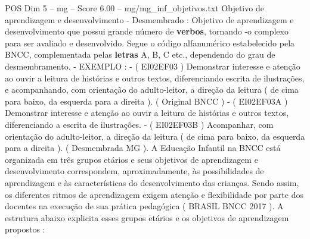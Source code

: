 \begin{textsample}{POS Dim 5 – mg – Score 6.00 – mg/mg\_inf\_objetivos.txt}
Objetivo de aprendizagem e desenvolvimento - Desmembrado : Objetivo de aprendizagem e desenvolvimento que possui grande número de \textbf{verbos}, tornando -o complexo para ser avaliado e desenvolvido.
Segue o código alfanumérico estabelecido pela BNCC, complementada pelas \textbf{letras} A, B, C etc., dependendo do grau de desmembramento. - EXEMPLO : - ( EI02EF03 ) Demonstrar interesse e atenção ao ouvir a leitura de histórias e outros textos, diferenciando escrita de ilustrações, e acompanhando, com orientação do adulto-leitor, a direção da leitura ( de cima para baixo, da esquerda para a direita ). ( Original BNCC ) - ( EI02EF03A ) Demonstrar interesse e atenção ao ouvir a leitura de histórias e outros textos, diferenciando a escrita de ilustrações. - ( EI02EF03B ) Acompanhar, com orientação do adulto-leitor, a direção da leitura ( de cima para baixo, da esquerda para a direita ). ( Desmembrada MG ).
A Educação Infantil na BNCC está organizada em três grupos etários e seus objetivos de aprendizagem e desenvolvimento correspondem, aproximadamente, às possibilidades de aprendizagem e às características do desenvolvimento das crianças.
Sendo assim, os diferentes ritmos de aprendizagem exigem atenção e flexibilidade por parte dos docentes na execução de sua prática pedagógica ( BRASIL BNCC 2017 ).
A estrutura abaixo explicita esses grupos etários e os objetivos de aprendizagem propostos :

\end{textsample}

